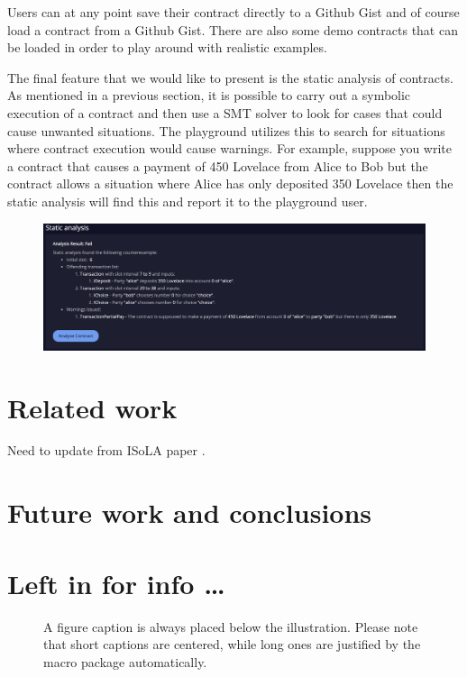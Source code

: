 \documentclass[runningheads]{llncs}
\begin{document}
Users can at any point save their contract directly to a Github Gist and of course load a contract from a Github Gist. There are also some demo contracts that can be loaded in order to play around with realistic examples.

The final feature that we would like to present is the static analysis of contracts. As mentioned in a previous section, it is possible to carry out a symbolic execution of a contract and then use a SMT solver to look for cases that could cause unwanted situations. The playground utilizes this to search for situations where contract execution would cause warnings. For example, suppose you write a contract that causes a payment of 450 Lovelace from Alice to Bob but the contract allows a situation where Alice has only deposited 350 Lovelace then the static analysis will find this and report it to the playground user.
\begin{figure}
    \includegraphics[width=1\textwidth]{static_analysis.png}
\end{figure}
\clearpage
\section{Related work}

Need to update from ISoLA paper \cite{isola-marlowe}.

\section{Future work and conclusions}

\section*{Left in for info \ldots}

\begin{figure}
\caption{A figure caption is always placed below the illustration.
Please note that short captions are centered, while long ones are
justified by the macro package automatically.} \label{fig1}
\end{figure}


%
%
%


%
\end{document}
